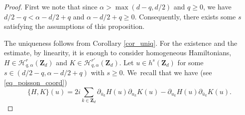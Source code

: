 \begin{proof} First we note that since $\alpha>\max(d-q,d/2)$ and $q\geq 0$, we have $d/2-q < \alpha-d/2+q$ and $\alpha-d/2+q \geq 0$. Consequently, there exists some $s$ satisfying the assumptions of this proposition.

The uniqueness follows from Corollary \ref{cor_uniq}. For the existence and the estimate, by linearity, it is enough to consider homogeneous Hamiltonians, $H\in \mathscr{H}_{q,\alpha}^r(\mathbf{Z}_d)$ and $K\in \mathscr{H}_{q,\alpha}^{r'}(\mathbf{Z}_d)$. Let $u\in h^s(\mathbf{Z}_d)$ for some $s\in (d/2-q, \alpha-d/2+q)$ with $s\geq 0$. We~recall that we have (see \eqref{eq_poisson_coord})
\begin{equation}
\label{eq_un_lapin}
\{ H,K\}(u) =
2i \sum_{k\in \mathbf{Z}_d} \partial_{\bar{u}_k}H(u) \partial_{u_k} K(u) - \partial_{u_k}H(u) \partial_{\bar{u}_k} K(u).
\end{equation}


\end{proof}
